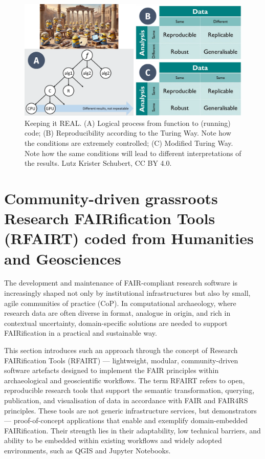 \documentclass{eceasst}
\begin{document}
\begin{figure}[h!]
    \centering
    \includegraphics[width=0.95\linewidth]{ECEASST-LaTeX-Templates/img/REAL.png}
    \caption{Keeping it REAL. (A) Logical process from function to (running) code; (B) Reproducibility according to the Turing Way. Note how the conditions are extremely controlled; (C) Modified Turing Way. Note how the same conditions will lead to different interpretations of the results. Lutz Krister Schubert, CC BY 4.0.}
    \label{fig:real}
\end{figure}

\section{Community-driven grassroots Research FAIRification Tools (RFAIRT) coded from Humanities and Geosciences}\label{Sec31}

The development and maintenance of FAIR-compliant research software is increasingly shaped not only by institutional infrastructures but also by small, agile communities of practice (CoP). In computational archaeology, where research data are often diverse in format, analogue in origin, and rich in contextual uncertainty, domain-specific solutions are needed to support FAIRification in a practical and sustainable way. 

This section introduces such an approach through the concept of Research FAIRification Tools (RFAIRT) — lightweight, modular, community-driven software artefacts designed to implement the FAIR principles within archaeological and geoscientific workflows. The term RFAIRT refers to open, reproducible research tools that support the semantic transformation, querying, publication, and visualisation of data in accordance with FAIR and FAIR4RS principles. These tools are not generic infrastructure services, but demonstrators — proof-of-concept applications that enable and exemplify domain-embedded FAIRification. Their strength lies in their adaptability, low technical barriers, and ability to be embedded within existing workflows and widely adopted environments, such as QGIS and Jupyter Notebooks. 
\end{document}

